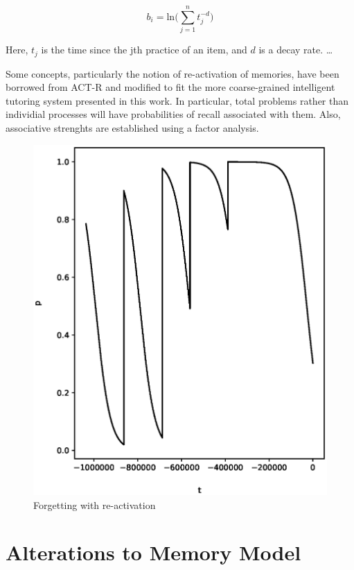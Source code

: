 \begin{equation}
\label{eq:anderson}
b_i = \mathrm{ln} \Bigg( \displaystyle\sum_{j=1}^n t_j^{-d} \Bigg)
\end{equation}

Here, $t_j$ is the time since the jth practice of an item, and $d$ is a decay
rate. \ldots

Some concepts, particularly the notion of re-activation of memories, have been
borrowed from ACT-R and modified to fit the more coarse-grained intelligent
tutoring system presented in this work.  In particular, total problems rather
than individial processes will have probabilities of recall associated with
them.  Also, associative strenghts are established using a factor analysis.

\begin{figure}[p!]
 \label{fig:memory}
 \includegraphics{fig/memory.eps} 
 \caption{Forgetting with re-activation}
\end{figure}

\section{Alterations to Memory Model}

